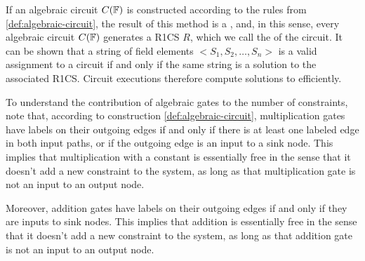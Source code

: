 If an algebraic circuit $C(\mathbb{F})$ is constructed according to the rules from \ref{def:algebraic-circuit}, the result of this method is a , and, in this sense, every algebraic circuit $C(\mathbb{F})$ generates a R1CS $R$, which we call the  of the circuit. It can be shown that a string of field elements $<S_1,S_2,\ldots, S_n>$ is a valid assignment to a circuit if and only if the same string is a solution to the associated R1CS. Circuit executions therefore compute solutions to  efficiently. 

To understand the contribution of algebraic gates to the number of constraints, note that,
according to construction \ref{def:algebraic-circuit}, multiplication gates have labels on their outgoing edges if and only if there is at least one labeled edge in both input paths, or if the outgoing edge is an input to a sink node. This implies that multiplication with a constant is essentially free in the sense that it doesn't add a new constraint to the system, as long as that multiplication gate is not an input to an output node. 

Moreover, addition gates have labels on their outgoing edges if and only if they are inputs to sink nodes. This implies that addition is essentially free in the sense that it doesn't add a new constraint to the system, as long as that addition gate is not an input to an output node. 

